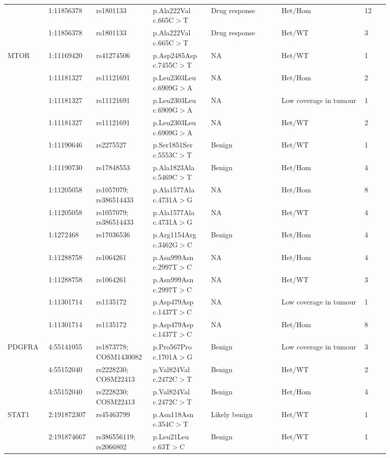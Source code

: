 \begin{landscape}
\begin{longtable}{p{0.09\linewidth}|p{0.1\linewidth}p{0.12\linewidth}p{0.14\linewidth}p{0.17\linewidth}p{0.2\linewidth}p{0.06\linewidth}}
		\\
		& 1:11856378 & rs1801133 & p.Ala222Val c.665C$>$T & Drug response & Het$/$Hom & 12
		\\
		& 1:11856378 & rs1801133 & p.Ala222Val c.665C$>$T & Drug response & Het$/$WT & 3
		\\
		\hline
		MTOR & 1:11169420 & rs41274506 & p.Asp2485Asp c.7455C$>$T & NA & Het$/$WT & 1
		\\
		& 1:11181327 & rs11121691 & p.Leu2303Leu c.6909G$>$A & NA & Het$/$Hom & 2
		\\
		& 1:11181327 & rs11121691 & p.Leu2303Leu c.6909G$>$A & NA & Low coverage in tumour & 1
		\\
		& 1:11181327 & rs11121691 & p.Leu2303Leu c.6909G$>$A & NA & Het$/$WT & 2
		\\
		& 1:11190646 & rs2275527 & p.Ser1851Ser c.5553C$>$T & Benign & Het$/$WT & 1
		\\
		& 1:11190730 & rs17848553 & p.Ala1823Ala c.5469C$>$T & Benign & Het$/$Hom & 4
		\\
		& 1:11205058 & rs1057079; rs386514433 & p.Ala1577Ala c.4731A$>$G & NA & Het$/$Hom & 8
		\\
		& 1:11205058 & rs1057079; rs386514433 & p.Ala1577Ala c.4731A$>$G & NA & Het$/$WT & 4
		\\
		& 1:1272468 & rs17036536 & p.Arg1154Arg c.3462G$>$C & Benign & Het$/$Hom & 4
		\\
		& 1:11288758 & rs1064261 & p.Asn999Asn c.2997T$>$C & NA & Het$/$Hom & 4
		\\
		& 1:11288758 & rs1064261 & p.Asn999Asn c.2997T$>$C & NA & Het$/$WT & 3
		\\
		& 1:11301714 & rs1135172 & p.Asp479Asp c.1437T$>$C & NA & Low coverage in tumour & 1
		\\
		& 1:11301714 & rs1135172 & p.Asp479Asp c.1437T$>$C & NA & Het$/$Hom & 8
		\\
		\hline
		PDGFRA & 4:55141055 & rs1873778; COSM1430082 & p.Pro567Pro c.1701A$>$G & Benign & Low coverage in tumour & 3
		\\
		& 4:55152040 & rs2228230; COSM22413 & p.Val824Val c.2472C$>$T & Benign & Het$/$WT & 2
		\\
		& 4:55152040 & rs2228230; COSM22413 & p.Val824Val c.2472C$>$T & Benign & Het$/$Hom & 4
		\\
		\hline
		STAT1 & 2:191872307 & rs45463799 & p.Asn118Asn c.354C$>$T & Likely benign & Het$/$WT & 1
		\\
		& 2:191874667 & rs386556119; rs2066802 & p.Leu21Leu c.63T$>$C & Benign & Het$/$WT & 1

\end{longtable}
\end{landscape}
